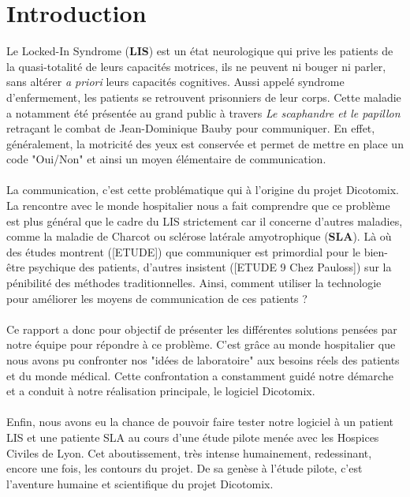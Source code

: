 \documentclass[11pt,a4paper]{article}
\theoremstyle{plain}
\theoremstyle{definition}
\begin{document}
\tableofcontents

\newpage
\section{Introduction}

Le Locked-In Syndrome (\textbf{LIS}) est un état neurologique qui prive les patients de la quasi-totalité de leurs capacités motrices, ils ne peuvent ni bouger ni parler,
sans altérer \textit{a priori} leurs capacités cognitives. Aussi appelé syndrome d'enfermement, les patients se retrouvent prisonniers de leur corps.
Cette maladie a notamment été présentée au grand public à travers \textit{Le scaphandre et le papillon} retraçant le combat de Jean-Dominique Bauby pour communiquer. 
En effet, généralement, la motricité des yeux est conservée et permet de mettre en place un code "Oui/Non" et ainsi un moyen élémentaire de communication.

\paragraph{} La communication, c'est cette problématique qui à l'origine du projet Dicotomix. La rencontre avec le monde hospitalier nous a fait comprendre que ce problème est plus général 
que le cadre du LIS strictement car il concerne d'autres maladies, comme la maladie de Charcot ou sclérose latérale amyotrophique (\textbf{SLA}). Là où des études montrent ([ETUDE]) que communiquer est primordial pour le bien-être psychique des patients, d'autres insistent ([ETUDE 9 Chez Pauloss]) sur la pénibilité des méthodes traditionnelles. Ainsi, comment utiliser la technologie pour améliorer les moyens de communication de ces patients ? 

\paragraph{} Ce rapport a donc pour objectif de présenter les différentes solutions pensées par notre équipe pour répondre à ce problème. C'est grâce au monde hospitalier que 
nous avons pu confronter nos "idées de laboratoire" aux besoins réels des patients et du monde médical. Cette confrontation a constamment guidé notre démarche et a conduit à notre
réalisation principale, le logiciel Dicotomix.

\paragraph{} Enfin, nous avons eu la chance de pouvoir faire tester notre logiciel à un patient LIS et une patiente SLA au cours d'une étude pilote menée avec les Hospices Civiles de Lyon.
Cet aboutissement, très intense humainement, redessinant, encore une fois, les contours du projet.
De sa genèse à l'étude pilote, c'est l'aventure humaine et scientifique du projet Dicotomix.
\end{document}
